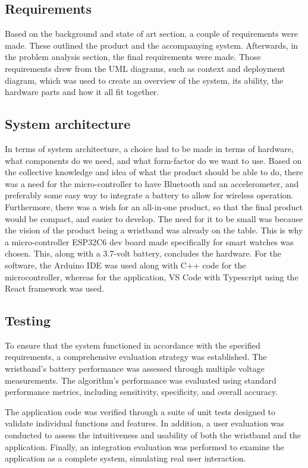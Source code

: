 \subsection{Requirements}
Based on the background and state of art section, a couple of requirements were made. These outlined the product and the accompanying system. Afterwards, in the problem analysis section, the final requirements were made. Those requirements drew from the UML diagrams, such as context and deployment diagram, which was used to create an overview of the system, its ability, the hardware parts and how it all fit together. 

\subsection{System architecture}
In terms of system architecture, a choice had to be made in terms of hardware, what components do we need, and what form-factor do we want to use. Based on the collective knowledge and idea of what the product should be able to do, there was a need for the micro-controller to have Bluetooth and an accelerometer, and preferably some easy way to integrate a battery to allow for wireless operation. Furthermore, there was a wish for an all-in-one product, so that the final product would be compact, and easier to develop. The need for it to be small was because the vision of the product being a wristband was already on the table. This is why a micro-controller ESP32C6 dev board made specifically for smart watches was chosen. This, along with a 3.7-volt battery, concludes the hardware. For the software, the Arduino IDE was used along with C++ code for the microcontroller, whereas for the application, VS Code with Typescript using the React framework was used. 

\subsection{Testing}
To ensure that the system functioned in accordance with the specified requirements, a comprehensive evaluation strategy was established. The wristband’s battery performance was assessed through multiple voltage measurements. The algorithm’s performance was evaluated using standard performance metrics, including sensitivity, specificity, and overall accuracy.

The application code was verified through a suite of unit tests designed to validate individual functions and features. In addition, a user evaluation was conducted to assess the intuitiveness and usability of both the wristband and the application. Finally, an integration evaluation was performed to examine the application as a complete system, simulating real user interaction.
